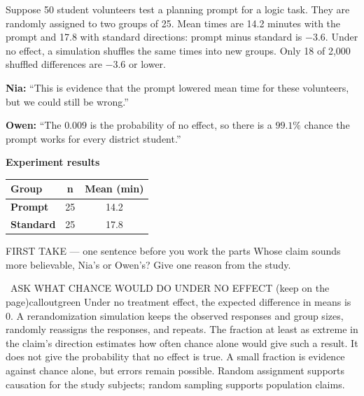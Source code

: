 \documentclass[11pt]{article}
\begin{document}


Suppose 50 student volunteers test a planning prompt for a logic task. They are randomly assigned to two groups of 25. Mean times are 14.2 minutes with the prompt and 17.8 with standard directions: prompt minus standard is $-3.6$. Under no effect, a simulation shuffles the same times into new groups. Only 18 of 2{,}000 shuffled differences are $-3.6$ or lower.\par\smallskip \textbf{Nia:} ``This is evidence that the prompt lowered mean time for these volunteers, but we could still be wrong.''\par \textbf{Owen:} ``The $0.009$ is the probability of no effect, so there is a $99.1\%$ chance the prompt works for every district student.''\par
\begin{center}
\textbf{Experiment results}\par\smallskip
\begin{tabular}{|l|c|c|}
\hline
\textbf{Group} & \textbf{n} & \textbf{Mean (min)} \\ \hline
\textbf{Prompt} & 25 & 14.2 \\ \hline
\textbf{Standard} & 25 & 17.8 \\ \hline
\end{tabular}
\end{center}
\begin{firsttakebox}{FIRST TAKE --- one sentence before you work the parts}
Whose claim sounds more believable, Nia's or Owen's? Give one reason from the study.
\workspace{0.9in}
\end{firsttakebox}

\begin{callout}{\IconBook\ ASK WHAT CHANCE WOULD DO UNDER NO EFFECT (keep on the page)}{calloutgreen}
Under no treatment effect, the expected difference in means is 0. A rerandomization simulation
keeps the observed responses and group sizes, randomly reassigns the responses, and repeats.
The fraction at least as extreme in the claim's direction estimates how often chance alone
would give such a result. It does not give the probability that no effect is true.
A small fraction is evidence against chance alone, but errors remain possible.
Random assignment supports causation for the study subjects; random sampling supports population claims.
\end{callout}
\end{document}
